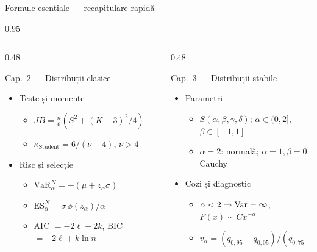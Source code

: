 \documentclass[9pt, aspectratio=169, t]{beamer}
\begin{document}
\begin{frame}[shrink=35]{Formule esențiale --- recapitulare rapidă}
\begin{cminipage}{0.95\textwidth}
\begin{columns}[T]
\begin{column}{0.48\textwidth}
\begin{block}{Cap.~2 --- Distribuții clasice}
\small
\begin{itemize}\setlength{\itemsep}{0pt}
    \item Teste și momente
    \begin{itemize}\setlength{\itemsep}{0pt}
        \item $JB = \frac{n}{6}(S^2 + (K-3)^2/4)$
        \item $\kappa_{\text{Student}} = 6/(\nu-4)$, $\nu > 4$
    \end{itemize}
    \item Risc și selecție
    \begin{itemize}\setlength{\itemsep}{0pt}
        \item $\text{VaR}^N_\alpha = -(\mu + z_\alpha \sigma)$
        \item $\text{ES}^N_\alpha = \sigma\,\phi(z_\alpha)/\alpha$
        \item AIC $= -2\ell + 2k$, BIC $= -2\ell + k\ln n$
    \end{itemize}
\end{itemize}
\end{block}
\end{column}
\begin{column}{0.48\textwidth}
\begin{block}{Cap.~3 --- Distribuții stabile}
\small
\begin{itemize}\setlength{\itemsep}{0pt}
    \item Parametri
    \begin{itemize}\setlength{\itemsep}{0pt}
        \item $S(\alpha, \beta, \gamma, \delta)$; $\alpha \in (0,2]$, $\beta \in [-1,1]$
        \item $\alpha = 2$: normală; $\alpha = 1, \beta = 0$: Cauchy
    \end{itemize}
    \item Cozi și diagnostic
    \begin{itemize}\setlength{\itemsep}{0pt}
        \item $\alpha < 2 \Rightarrow \text{Var} = \infty$; $\bar F(x) \sim Cx^{-\alpha}$
        \item $v_\alpha = (q_{0{,}95}-q_{0{,}05})/(q_{0{,}75}-q_{0{,}25})$
    \end{itemize}
\end{itemize}
\end{block}


\end{column}
\end{columns}
\end{cminipage}
\end{frame}
\end{document}
